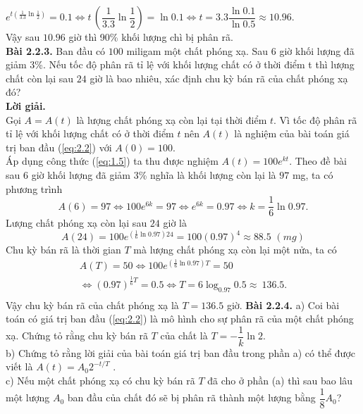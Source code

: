     ${{e}^{t(\frac{1}{3.3}\ln \frac{1}{2})}}=0.1\Leftrightarrow t\,(\dfrac{1}{3.3}\ln \dfrac{1}{2})=\ln 0.1\Leftrightarrow t=3.3\dfrac{\ln 0.1}{\ln 0.5}\approx 10.96.\,\,\,$\\
    Vậy sau $10.96$ giờ thì 90\% khối lượng chì bị phân rã.\\
    \textbf{Bài 2.2.3. }Ban đầu có $100$ miligam một chất phóng xạ. Sau $6$ giờ khối lượng đã giảm $3$\%. Nếu tốc độ phân rã tỉ lệ với khối lượng chất có ở thời điểm t thì lượng chất còn 
    lại sau $24$ giờ là bao nhiêu, xác định chu kỳ bán rã của chất phóng xạ đó?\\
    \textbf{Lời giải. }\\
    Gọi $A = A (t)$ là lượng chất phóng xạ còn lại tại thời điểm $t$. Vì tốc độ phân rã tỉ lệ với khối lượng chất có ở thời điểm $t$ nên $A(t)$ là nghiệm của bài toán giá trị ban đầu 
    (\ref{eq:2.2}) với $A(0) = 100.$\\
    Áp dụng công thức (\ref{eq:1.5}) ta thu được nghiệm $A(t)=100{{e}^{kt}}$.
    Theo đề bài sau $6$ giờ khối lượng đã giảm $3$\% nghĩa là khối lượng còn lại là $97$ mg, ta có phương trình \\ $$A(6)=97\Leftrightarrow 100{{e}^{6k}}=97\Leftrightarrow {{e}^{6k}}=0.97\Leftrightarrow k=\dfrac{1}{6}\ln 0.97.$$
    Lượng chất phóng xạ còn lại sau $24$ giờ là $$A(24)=100{{e}^{\left(\frac{1}{6}\ln 0.97\right)24}}=100{{(0.97)}^{4}}\approx 88.5\,\,(mg)$$
    Chu kỳ bán rã là thời gian $T$ mà lượng chất phóng xạ còn lại một nửa, ta có  \newline
    $$\begin{array}{lll}
    A(T)=50\Leftrightarrow 100{{e}^{\left(\frac{1}{6}\ln 0.97\right)T}}=50\\ \Leftrightarrow {{(0.97)}^{\frac{1}{6}T}}=0.5\Leftrightarrow T=6{{\log }_{0.97}}0.5\approx ~136.5.\\
   \end{array}$$
    Vậy chu kỳ bán rã của chất phóng xạ là $T= 136.5$ giờ.\newpage
\noindent\textbf{Bài 2.2.4.} a) Coi bài toán có giá trị ban đầu (\ref{eq:2.2}) là mô hình cho sự phân rã của một chất phóng xạ. Chứng tỏ rằng chu kỳ bán rã $T$ của chất là $T=-\dfrac{1}{k}\ln 2$.\\
b) Chứng tỏ rằng lời giải của bài toán giá trị ban đầu trong phần a) có thể được viết là $A(t)={{A}_{0}}{{2}^{-t/T}}$ . \\
c) Nếu một chất phóng xạ có chu kỳ bán rã $T$ đã cho ở phần (a) thì sau bao lâu một lượng $A_0$ ban đầu của chất đó sẽ bị phân rã thành một lượng bằng $\dfrac{1}{8}{{A}_{0}}$?\\
